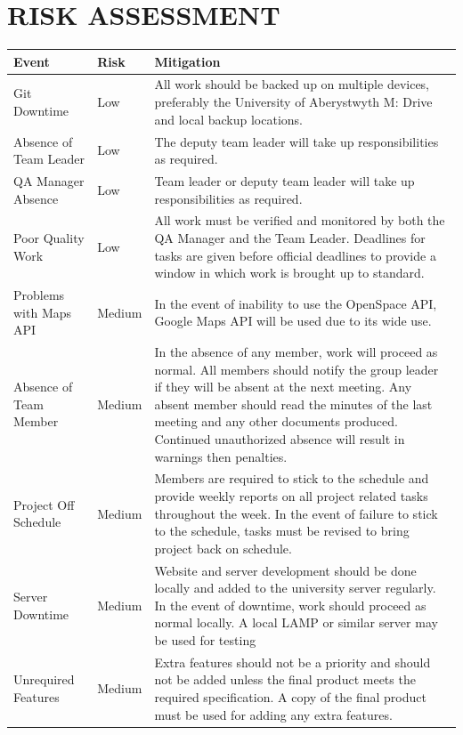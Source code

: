 \documentclass[12pt]{article}
\begin{document}
\section{RISK ASSESSMENT}
\begin{longtable}{|p{2.5cm}|p{1.5cm}|p{10cm}|}
\hline
	Event & Risk & Mitigation\\
\hline
	Git Downtime & Low & All work should be backed up on multiple devices, preferably the University of Aberystwyth M: Drive and local backup locations.\\
\hline
	Absence of Team Leader & Low & The deputy team leader will take up responsibilities as required.\\
\hline
	QA Manager Absence & Low & Team leader or deputy team leader will take up responsibilities as required. \\
\hline 
	Poor Quality Work & Low & All work must be verified and monitored by both the QA Manager and the Team Leader. Deadlines for tasks are given before official deadlines to provide a window in which work is brought up to standard. \\ 
\hline
	Problems with Maps API & Medium & In the event of inability to use the OpenSpace API, Google Maps API will be used due to its wide use. \\ 
\hline 
	Absence of Team Member & Medium & 
In the absence of any member, work will proceed as normal. All members should notify the group leader if they will be absent at the next meeting. Any absent member should read the minutes of the last meeting and any other documents produced. Continued unauthorized absence will result in warnings then penalties.\\
\hline 
	Project Off Schedule & Medium & Members are required to stick to the schedule and provide weekly reports on all project related tasks throughout the week. In the event of failure to stick to the schedule, tasks must be revised to bring project back on schedule.\\
\hline 
	Server Downtime & Medium & Website and server development should be done locally and added to the university server regularly. In the event of downtime, work should proceed as normal locally. A local LAMP or similar server may be used for testing \\
\hline 
	Unrequired Features & Medium & Extra features should not be a priority and should not be added unless the final product meets the required specification. A copy of the final product must be used for adding any extra features. \\

\end{longtable}
\end{document}
